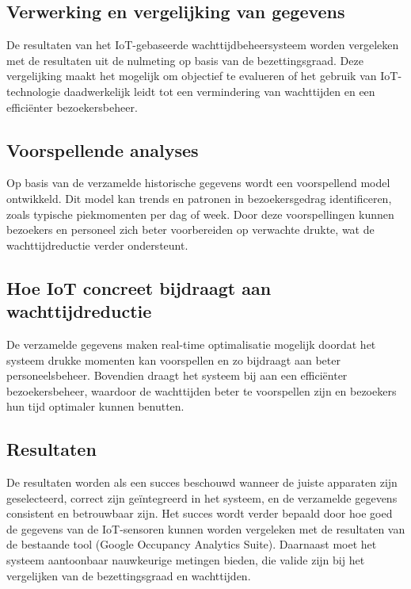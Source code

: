 \subsection{Verwerking en vergelijking van gegevens}
De resultaten van het IoT-gebaseerde wachttijdbeheersysteem worden vergeleken met de resultaten uit de nulmeting op basis van de bezettingsgraad. Deze vergelijking maakt het mogelijk om objectief te evalueren of het gebruik van IoT-technologie daadwerkelijk leidt tot een vermindering van wachttijden en een efficiënter bezoekersbeheer.

\subsection{Voorspellende analyses}
Op basis van de verzamelde historische gegevens wordt een voorspellend model ontwikkeld. Dit model kan trends en patronen in bezoekersgedrag identificeren, zoals typische piekmomenten per dag of week. Door deze voorspellingen kunnen bezoekers en personeel zich beter voorbereiden op verwachte drukte, wat de wachttijdreductie verder ondersteunt. 

\subsection{Hoe IoT concreet bijdraagt aan wachttijdreductie}
De verzamelde gegevens maken real-time optimalisatie mogelijk doordat het systeem drukke momenten kan voorspellen en zo bijdraagt aan beter personeelsbeheer. Bovendien draagt het systeem bij aan een efficiënter bezoekersbeheer, waardoor de wachttijden beter te voorspellen zijn en bezoekers hun tijd optimaler kunnen benutten.

\subsection{Resultaten}
De resultaten worden als een succes beschouwd wanneer de juiste apparaten zijn geselecteerd, correct zijn geïntegreerd in het systeem, en de verzamelde gegevens consistent en betrouwbaar zijn. Het succes wordt verder bepaald door hoe goed de gegevens van de IoT-sensoren kunnen worden vergeleken met de resultaten van de bestaande tool (Google Occupancy Analytics Suite). Daarnaast moet het systeem aantoonbaar nauwkeurige metingen bieden, die valide zijn bij het vergelijken van de bezettingsgraad en wachttijden.




